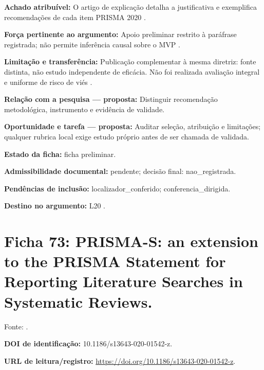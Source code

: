 \noindent\textbf{Achado atribuível:} O artigo de explicação detalha a justificativa e exemplifica recomendações de cada item PRISMA 2020 \citep{SU02}.\par\medskip

\noindent\textbf{Força pertinente ao argumento:} Apoio preliminar restrito à paráfrase registrada; não permite inferência causal sobre o MVP \citep{SU02}.\par\medskip

\noindent\textbf{Limitação e transferência:} Publicação complementar à mesma diretriz: fonte distinta, não estudo independente de eficácia. Não foi realizada avaliação integral e uniforme de risco de viés \citep{SU02}.\par\medskip

\noindent\textbf{Relação com a pesquisa — proposta:} Distinguir recomendação metodológica, instrumento e evidência de validade.\par\medskip

\noindent\textbf{Oportunidade e tarefa — proposta:} Auditar seleção, atribuição e limitações; qualquer rubrica local exige estudo próprio antes de ser chamada de validada.\par\medskip

\noindent\textbf{Estado da ficha:} ficha preliminar.\par\medskip

\noindent\textbf{Admissibilidade documental:} pendente; decisão final: nao\_registrada.\par\medskip

\noindent\textbf{Pendências de inclusão:} localizador\_conferido; conferencia\_dirigida.\par\medskip

\noindent\textbf{Destino no argumento:} L20 .

\clearpage\section*{Ficha 73: PRISMA-S: an extension to the PRISMA Statement for Reporting Literature Searches in Systematic Reviews.}

Fonte: \citet{SU03}.

\noindent\textbf{DOI de identificação:} 10.1186/s13643-020-01542-z.\par\medskip

\noindent\textbf{URL de leitura/registro:} \url{https://doi.org/10.1186/s13643-020-01542-z}.\par\medskip

